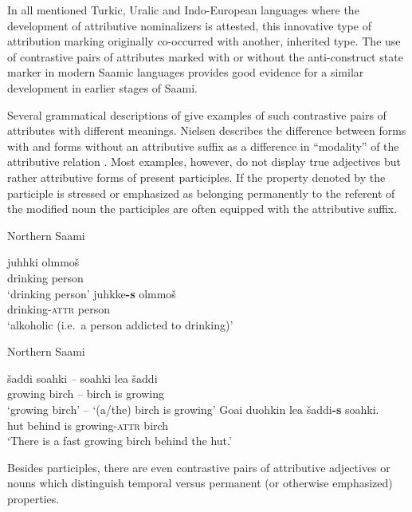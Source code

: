 {In all mentioned Turkic, Uralic and Indo-European languages where the development of attributive nominalizers is attested, this innovative type of attribution marking originally co-occurred with another, inherited type. The use of contrastive pairs of attributes marked with or without the anti\hyp{}construct state marker in modern Saamic languages provides good evidence for a similar development in earlier stages of Saami.

Several grammatical descriptions of  give examples of such contrastive pairs of attributes with different meanings. Nielsen describes the difference between forms with and forms without an attributive suffix as a difference in “modality” of the attributive relation \cite[203]{nielsen1945b}. Most examples, however, do not display true adjectives but rather attributive forms of present participles. If the property denoted by the participle is stressed or emphasized as belonging permanently to the referent of the modified noun the participles are often equipped with the attributive suffix.
\begin{exe}
\ex
\begin{xlist}
\ex \rm{Northern Saami \citep[204]{nielsen1945b}}
\begin{xlist}
\ex
\gll 	juhhki olmmoš\\
	drinking person\\
\glt	 ‘drinking person’
\ex	
\gll	juhkke\textbf{-s} olmmoš\\
	drinking-\textsc{attr} person\\
\glt	‘alkoholic (i.e.~a person addicted to drinking)’
\end{xlist}
\ex \rm{Northern Saami \citep[282]{bartens1989}}
\begin{xlist}
\ex 	
\gll	šaddi soahki – soahki lea šaddi\\
 	growing birch – birch is growing\\
\glt	‘growing birch’ – ‘(a/the) birch is growing’
\ex
\gll	Goa{\dj}i duohkin lea šaddi\textbf{-s} soahki.\\
	hut behind is growing-\textsc{attr} birch\\
\glt	‘There is a fast growing birch behind the hut.’
\end{xlist}
\end{xlist}
\end{exe}
Besides participles, there are even contrastive pairs of attributive adjectives or nouns which distinguish temporal versus permanent (or otherwise emphasized) properties.
}

